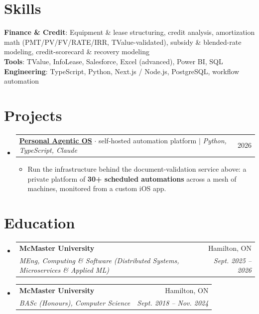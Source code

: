\documentclass[letterpaper,11pt]{article}
\makeatletter
\newcommand{\resumeItem}[1]{
  \item\small{
    {#1\vspace{-2pt}}
  }
}
\newcommand{\resumeSubheading}[4]{
  \vspace{-2pt}\item
    \begin{tabular*}{0.97\textwidth}[t]{l@{\extracolsep{\fill}}r}
      \textbf{#1} & #2 \\
      \textit{\small#3} & \textit{\small #4} \\
    \end{tabular*}\vspace{-7pt}
}
\newcommand{\resumeProjectHeading}[2]{
    \item
    \begin{tabular*}{0.97\textwidth}{l@{\extracolsep{\fill}}r}
      \small#1 & #2 \\
    \end{tabular*}\vspace{-7pt}
}
\newcommand{\resumeSubHeadingListStart}{\begin{itemize}[leftmargin=0.15in, label={}]}
\newcommand{\resumeSubHeadingListEnd}{\end{itemize}}
\newcommand{\resumeItemListStart}{\begin{itemize}}
\newcommand{\resumeItemListEnd}{\end{itemize}\vspace{-5pt}}
\makeatother
\begin{document}
\section{Skills}
\begin{itemize}[leftmargin=0.15in, label={}]
    \small{\item{
     \textbf{Finance \& Credit}{: Equipment \& lease structuring, credit analysis, amortization math (PMT/PV/FV/RATE/IRR, TValue-validated), subsidy \& blended-rate modeling, credit-scorecard \& recovery modeling} \\
     \textbf{Tools}{: TValue, InfoLease, Salesforce, Excel (advanced), Power BI, SQL} \\
     \textbf{Engineering}{: TypeScript, Python, Next.js / Node.js, PostgreSQL, workflow automation}
    }}
\end{itemize}

\section{Projects}
    \resumeSubHeadingListStart
      \resumeProjectHeading
          {\href{https://www.suleyman.io/architecture}{\underline{\textbf{Personal Agentic OS}}} $\cdot$ self-hosted automation platform $|$ \emph{Python, TypeScript, Claude}}{2026}
          \resumeItemListStart
            \resumeItem{Run the infrastructure behind the document-validation service above: a private platform of \textbf{30+ scheduled automations} across a mesh of machines, monitored from a custom iOS app.}
          \resumeItemListEnd
    \resumeSubHeadingListEnd

\section{Education}
  \resumeSubHeadingListStart
    \resumeSubheading
      {McMaster University}{Hamilton, ON}
      {MEng, Computing \& Software (Distributed Systems, Microservices \& Applied ML)}{Sept. 2025 -- 2026}
    \resumeSubheading
      {McMaster University}{Hamilton, ON}
      {BASc (Honours), Computer Science}{Sept. 2018 -- Nov. 2024}
  \resumeSubHeadingListEnd
\end{document}
